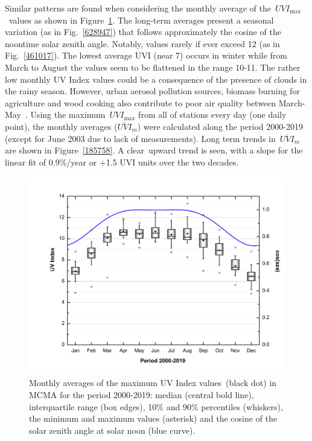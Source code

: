 \documentclass[journal=jacsat,manuscript=article]{achemso}
\begin{document}
Similar patterns are found when considering the monthly average of
the~\(UVI_{\max}\)~values as shown in
Figure~{\ref{310112}}. The long-term averages present a
seasonal variation (as in Fig.~{\ref{628947}}) that
follows approximately the cosine of the noontime solar zenith angle.
Notably, values rarely if ever exceed 12 (as in
Fig.~{\ref{461017}}). The lowest average UVI (near 7)
occurs in winter while from March to August the values seem to be
flattened in the range 10-11. The rather low monthly UV Index values
could be a consequence of the presence of clouds in the rainy
season. However, urban aerosol pollution sources, biomass burning for
agriculture and wood cooking also contribute to poor air quality between
March-May~\citep{Retama_2015}. Using the
maximum~\(UVI_{\max}\) from all of stations every day (one daily
point), the monthly averages (\(\overline{UVI}_m\))
were calculated along the period 2000-2019 (except for June 2003 due to lack of measurements).
Long term trends in~\(\overline{UVI}_m\) are shown
in Figure~{\ref{185758}}. A clear~upward trend is seen,
with a slope for the linear fit of 0.9\%/year or +1.5 UVI units over the
two decades.


\begin{figure}[H]
  \begin{center}
    \includegraphics[width=0.70\columnwidth]{figures/Boxplotcos}
    \caption{{Monthly averages of the maximum UV Index values~(black
          dot) in MCMA for the period 2000-2019: median (central bold line),
          interquartile range (box edges), 10\% and 90\% percentiles (whiskers),
          the minimum and maximum values (asterisk) and the cosine of the solar zenith angle at solar
          noon (blue curve).
            {\label{310112}}%
        }}
  \end{center}
\end{figure}
\end{document}
